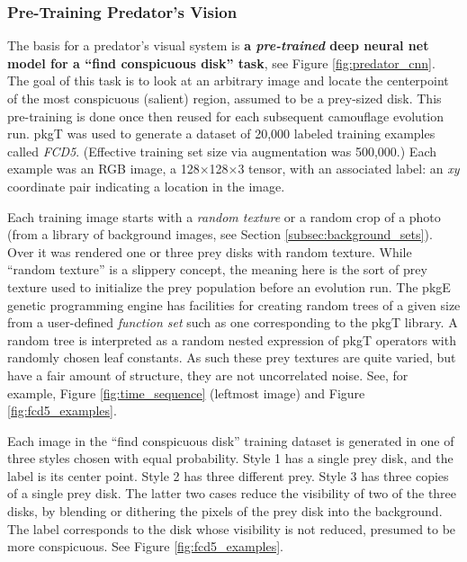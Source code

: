 \documentclass[acmtog]{acmart}
\newcommand{\jargon}[1]{\textit{#1}}
\newcommand{\texsyn}[0]{pkgT}
\newcommand{\lazypredator}[0]{pkgE}
\begin{document}
\subsubsection{Pre-Training Predator's Vision}
\label{sec:pre_train_predator}
The basis for a predator's visual system is \textbf{a \jargon{pre-trained} deep neural net model for a “find conspicuous disk” task}, see Figure \ref{fig:predator_cnn}. The goal of this task is to look at an arbitrary image and locate the centerpoint of the most conspicuous (salient) region, assumed to be a prey-sized disk. This pre-training is done once then reused for each subsequent camouflage evolution run. \texsyn{} was used to generate a dataset of 20,000 labeled training examples called \jargon{FCD5}. (Effective training set size via augmentation was 500,000.) Each example was an RGB image, a 128×128×3 tensor, with an associated label: an \textit{xy} coordinate pair indicating a location in the image.
\par
Each training image starts with a \jargon{random texture} or a random crop of a photo (from a library of background images, see Section \ref{subsec:background_sets}). Over it was rendered one or three prey disks with random texture. While “random texture” is a slippery concept, the meaning here is the sort of prey texture used to initialize the prey population before an evolution run. The \lazypredator{} genetic programming engine has facilities for creating random trees of a given size from a user-defined \jargon{function set} such as one corresponding to the \texsyn{} library. A random tree is interpreted as a random nested expression of \texsyn{} operators with randomly chosen leaf constants. As such these prey textures are quite varied, but have a fair amount of structure, they are not uncorrelated noise. See, for example, Figure \ref{fig:time_sequence} (leftmost image) and Figure \ref{fig:fcd5_examples}.
\par
Each image in the “find conspicuous disk” training dataset is generated in one of three styles chosen with equal probability. Style 1 has a single prey disk, and the label is its center point. Style 2 has three different prey. Style 3 has three copies of a single prey disk. The latter two cases reduce the visibility of two of the three disks, by blending or dithering the pixels of the prey disk into the background. The label corresponds to the disk whose visibility is not reduced, presumed to be more conspicuous. See Figure \ref{fig:fcd5_examples}.
\par
\end{document}
